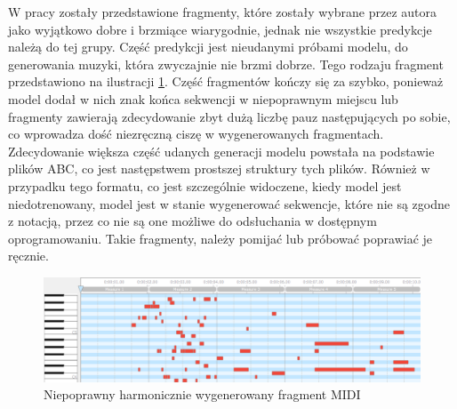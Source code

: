 \documentclass[data-science]{agh-wi} %
\begin{document}
W pracy zostały przedstawione fragmenty, które zostały wybrane przez autora jako wyjątkowo dobre i brzmiące wiarygodnie, jednak nie wszystkie predykcje należą do tej grupy. Część predykcji jest nieudanymi próbami modelu, do generowania muzyki, która zwyczajnie nie brzmi dobrze. Tego rodzaju fragment przedstawiono na ilustracji \ref*{fig:bad_midi}. Część fragmentów kończy się za szybko, ponieważ model dodał w nich znak końca sekwencji w niepoprawnym miejscu lub fragmenty zawierają zdecydowanie zbyt dużą liczbę pauz następujących po sobie, co wprowadza dość niezręczną ciszę w wygenerowanych fragmentach. Zdecydowanie większa część udanych generacji modelu powstała na podstawie plików ABC, co jest następstwem prostszej struktury tych plików. Również w przypadku tego formatu, co jest szczególnie widoczene, kiedy model jest niedotrenowany, model jest w stanie wygenerować sekwencje, które nie są zgodne z notacją, przez co nie są one możliwe do odsłuchania w dostępnym oprogramowaniu. Takie fragmenty, należy pomijać lub próbować poprawiać je ręcznie.

\begin{figure}[ht!]
    \centering
    \includegraphics[width=0.9\linewidth]{./img/bad_midi.png}
    \caption{Niepoprawny harmonicznie wygenerowany fragment MIDI}
    \label{fig:bad_midi}
\end{figure}
\end{document}
